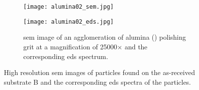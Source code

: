 \begin{figure}[htbp]
\begin{subfigure}[t]{\textwidth}
    \end{subfigure}%
    \par\bigskip
    \begin{subfigure}[t]{\textwidth}
          \begin{minipage}[t]{0.49\linewidth}
            \centering
            \texttt{[image: alumina02\_sem.jpg]}
          \end{minipage}
          \hfill
          \begin{minipage}[t]{0.49\linewidth}
            \centering
            \texttt{[image: alumina02\_eds.jpg]}
          \end{minipage}
        \caption{\Ac{sem} image of an agglomeration of alumina () polishing grit at a magnification of 25000$\times$ and the corresponding \acf{eds} spectrum.}\label{fig:subBa_polishing-grit_alumina}
    \end{subfigure}%
    \caption[\Ac{sem} images and \ac{eds} spectra of particles found on as-received substrate B.]{High resolution \acf{sem} images of particles found on the as-received substrate B and the corresponding \ac{eds} spectra of the particles.}\label{fig:subBa_sem_w_eds}
\end{figure}
%
